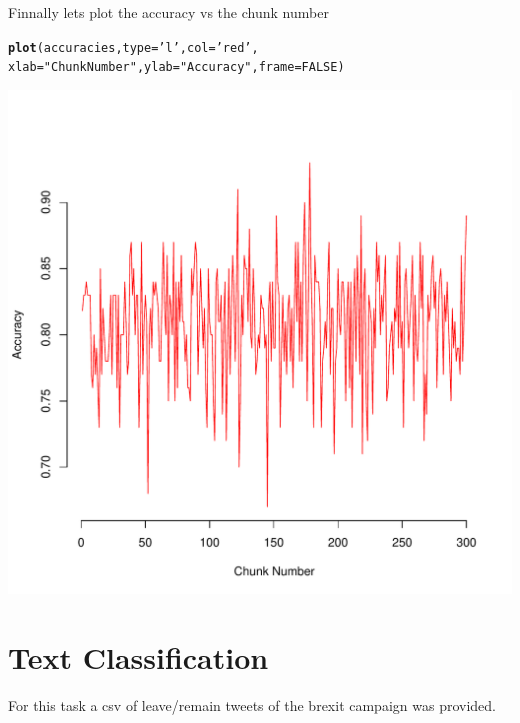\documentclass[10pt  ,usenames, dvipsnames]{article}\usepackage[]{graphicx}\usepackage[]{color}
\makeatletter
\def\maxwidth{ %
  \ifdim\Gin@nat@width>\linewidth
    \linewidth
  \else
    \Gin@nat@width
  \fi
}
\newcommand{\hlnum}[1]{\textcolor[rgb]{0.686,0.059,0.569}{#1}}%
\newcommand{\hlstr}[1]{\textcolor[rgb]{0.192,0.494,0.8}{#1}}%
\newcommand{\hlstd}[1]{\textcolor[rgb]{0.345,0.345,0.345}{#1}}%
\newcommand{\hlkwc}[1]{\textcolor[rgb]{0.333,0.667,0.333}{#1}}%
\newcommand{\hlkwd}[1]{\textcolor[rgb]{0.737,0.353,0.396}{\textbf{#1}}}%
\newenvironment{kframe}{%
 \def\at@end@of@kframe{}%
 \ifinner\ifhmode%
  \def\at@end@of@kframe{\end{minipage}}%
  \begin{minipage}{\columnwidth}%
 \fi\fi%
 \def\FrameCommand##1{\hskip\@totalleftmargin \hskip-\fboxsep
 \colorbox{shadecolor}{##1}\hskip-\fboxsep
     \hskip-\linewidth \hskip-\@totalleftmargin \hskip\columnwidth}%
 \MakeFramed {\advance\hsize-\width
   \@totalleftmargin\z@ \linewidth\hsize
   \@setminipage}}%
 {\par\unskip\endMakeFramed%
 \at@end@of@kframe}
\newenvironment{knitrout}{}{} %
\makeatother
\begin{document}
Finnally lets plot the accuracy vs the chunk number

\begin{knitrout}
\color{fgcolor}\begin{kframe}
\begin{alltt}
\hlkwd{plot}\hlstd{(accuracies,}\hlkwc{type}\hlstd{=}\hlstr{'l'}\hlstd{,}\hlkwc{col}\hlstd{=}\hlstr{'red'}\hlstd{,}
     \hlkwc{xlab}\hlstd{=}\hlstr{"Chunk Number"}\hlstd{,}\hlkwc{ylab}\hlstd{=}\hlstr{"Accuracy"}\hlstd{,}\hlkwc{frame}\hlstd{=}\hlnum{FALSE}\hlstd{)}
\end{alltt}
\end{kframe}
\end{knitrout}


\begin{knitrout}
\color{fgcolor}
\includegraphics[width=\maxwidth]{figure/unnamed-chunk-66-1} 

\end{knitrout}

\clearpage

\section {Text Classification}
For this task a csv of leave/remain tweets of the brexit campaign was provided.
\end{document}
